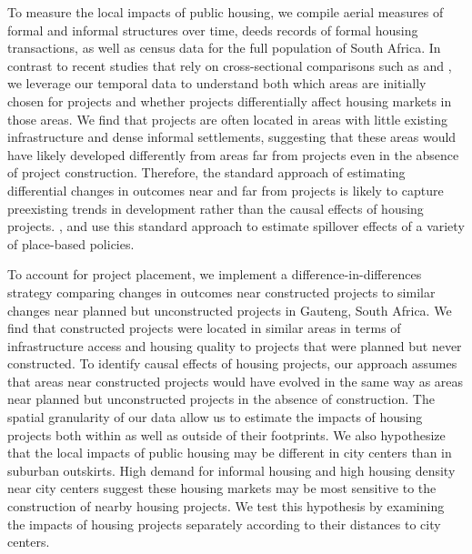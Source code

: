 \documentclass[12pt]{article}
\begin{document}
To measure the local impacts of public housing, we compile aerial measures of formal and informal structures over time, deeds records of formal housing transactions, as well as census data for the full population of South Africa.  In contrast to recent studies that rely on cross-sectional comparisons such as \cite{harari2018slum} and \cite{baruah2017planning}, we leverage our temporal data to understand both which areas are initially chosen for projects and whether projects differentially affect housing markets in those areas.  We find that projects are often located in areas with little existing infrastructure and dense informal settlements, suggesting that these areas would have likely developed differently from areas far from projects even in the absence of project construction.  Therefore, the standard approach of estimating differential changes in outcomes near and far from projects is likely to capture preexisting trends in development rather than the causal effects of housing projects.  \cite{rossi2010housing,hornbeck2017creative}, and \cite{diamond2016wants} use this standard approach to estimate spillover effects of a variety of place-based policies. %

To account for project placement, we implement a difference-in-differences strategy comparing changes in outcomes near constructed projects to similar changes near planned but unconstructed projects in Gauteng, South Africa.  We find that constructed projects were located in similar areas in terms of infrastructure access and housing quality to projects that were planned but never constructed.  To identify causal effects of housing projects, our approach assumes that areas near constructed projects would have evolved in the same way as areas near planned but unconstructed projects in the absence of construction.  The spatial granularity of our data allow us to estimate the impacts of housing projects both within as well as outside of their footprints.  We also hypothesize that the local impacts of public housing may be different in city centers than in suburban outskirts.  High demand for informal housing and high housing density near city centers suggest these housing markets may be most sensitive to the construction of nearby housing projects.  We test this hypothesis by examining the impacts of housing projects separately according to their distances to city centers.

\end{document}
